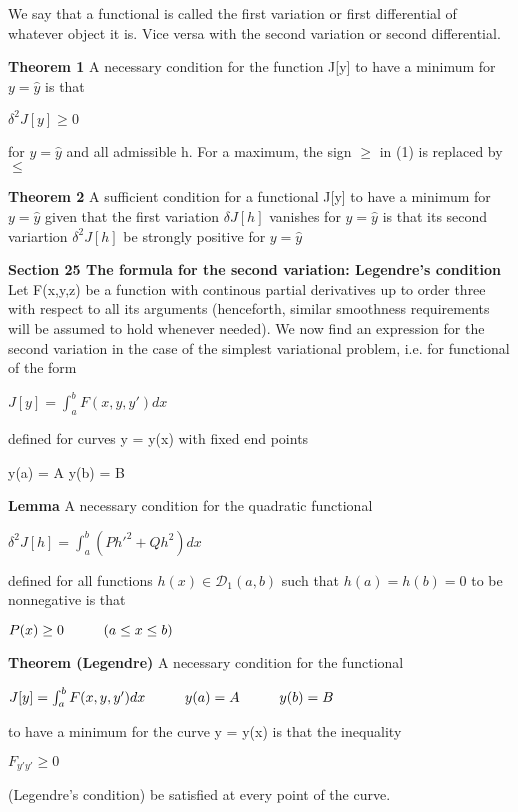 \documentclass{article}
\newcommand\tab[1][1cm]{\hspace*{#1}}
\begin{document}
We say that a functional is called the first variation or first differential of whatever object it is. Vice versa with the second variation or second differential.

\textbf {Theorem 1} A necessary condition for the function J[y] to have a minimum for $y = \hat{y}$ is that 
\begin{center}
$\delta^2 J[y] \geq 0$
\end{center}
for $y = \hat{y}$ and all admissible h. For a maximum, the sign $\geq$ in (1) is replaced by $\leq$

\textbf {Theorem 2} A sufficient condition for a functional J[y] to have a minimum for $y = \hat{y}$ given that the first variation $\delta J[h]$ vanishes for $y = \hat{y}$ is that its second variartion $\delta^2 J[h]$ be strongly positive for $y = \hat{y}$

\textbf {Section 25 The formula for the second variation: Legendre's condition}
Let F(x,y,z) be a function with continous partial derivatives up to order three with respect to all its arguments (henceforth, similar smoothness requirements will be assumed to hold whenever needed). We now find an expression for the second variation in the case of the simplest variational problem, i.e. for functional of the form
\begin{center}
$J[y] = \int_a^b F(x,y,y') dx$
\end{center}
defined for curves y = y(x) with fixed end points
\begin{center}
y(a) = A \tab y(b) = B
\end{center}

\textbf {Lemma} A necessary condition for the quadratic functional
\begin{center}
$\delta^2 J[h] = \int_a^b (Ph'^2 + Qh^2) dx$
\end{center}
defined for all functions $h(x) \in \mathcal{D}_1(a,b)$ such that $h(a) = h(b) = 0$ to be nonnegative is that
\begin{center}
$P(x) \geq 0 \tab (a \leq x \leq b)$
\end{center}

\textbf {Theorem (Legendre)} A necessary condition for the functional 
\begin{center}
$J[y] = \int_a^b F(x, y, y') dx \tab y(a) = A \tab y(b) = B$
\end{center}
to have a minimum for the curve y = y(x) is that the inequality 
\begin{center}
$F_{y'y'} \geq 0$
\end{center}
(Legendre's condition) be satisfied at every point of the curve.
\end{document}
